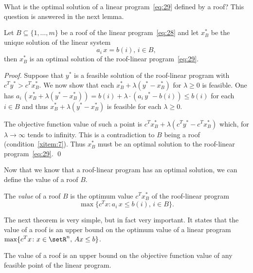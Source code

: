 \noindent 
What is the optimal solution of a linear program~\eqref{eq:29} defined
by a roof? This question is answered in the next lemma. 

\begin{lemma}
  \label{lem:2}
  Let $B\subseteq\{1,\ldots,m\}$ be a roof of the linear program~\eqref{eq:28}
  and let $x^*_B$ be the unique solution of the linear system 
  \begin{displaymath}
    a_i \,x = b(i), \, i \in B,
  \end{displaymath}
  then $x^*_B$ is an optimal solution of the roof-linear
  program~\eqref{eq:29}.
\end{lemma}


\begin{proof}
  Suppose that $y^*$ is a feasible solution of the roof-linear program
  with $c^Ty^*>c^Tx^*_B$. We now show that each $x_B^* + \lambda (y^* -x_B^*)$
  for $\lambda\geq0$ is feasible. One has $a_i\, (x_B^* + \lambda (y^* -x_B^*)) =
  b(i) + \lambda\cdot ( a_i\,y^* -  b(i) ) \leq b(i)$ for each $i \in B$ and thus
  $x_B^* + \lambda (y^* -x_B^*)$ is feasible for each $\lambda\geq0$. 
  
  The objective function value of such a point  is $c^Tx_B^* +
  \lambda(c^Ty^*-c^Tx^*_B)$ which, for $\lambda \to \infty$ tends to infinity. This
  is a contradiction to $B$ being a roof
  (condition~\ref{xitem:7}). Thus $x^*_B$ must be  an optimal 
  solution to the roof-linear program~\eqref{eq:29}.   \qed
\end{proof}


Now that we know that a roof-linear program has an optimal solution,
we can define the value of a roof $B$.

\begin{definition}
  The \emph{value}  of a roof $B$ is the optimum value $c^Tx^*_B$ of
  the roof-linear program
  \begin{displaymath}
    \max\{c^Tx \colon a_i\,x\leq b(i), \, i \in B\}. 
  \end{displaymath}
\end{definition}



The next theorem is very simple, but in fact very important. It states
that the value of a roof is an upper bound on the optimum value of a
linear program $\max\{c^Tx \colon x \in \setR^n, \, Ax\leq b\}$. 

\begin{theorem}
  \label{thr:6}
  The value of a roof is an upper bound on the objective function
  value of any feasible point of the linear program.   
\end{theorem}


